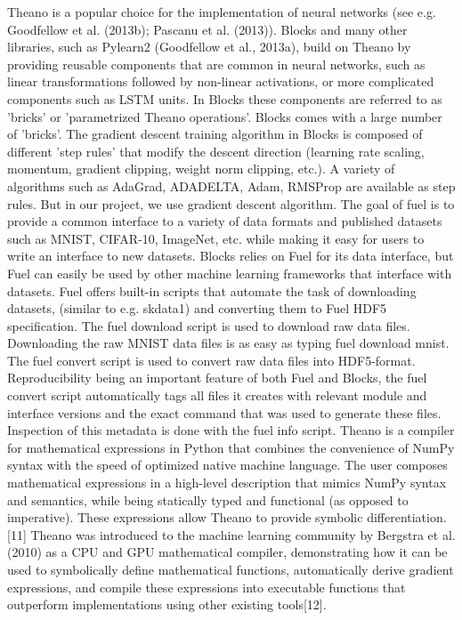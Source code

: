 \documentclass[runningheads,a4paper]{llncs}
\begin{document}
Theano is a popular choice for the implementation of neural networks (see e.g. Goodfellow et al. (2013b); Pascanu et al. (2013)). Blocks and many other libraries, such as Pylearn2 (Goodfellow et al., 2013a), build on Theano by providing reusable components that are common in neural networks, such as linear transformations followed by non-linear activations, or more complicated components such as LSTM units. In Blocks these components are referred to as 'bricks' or 'parametrized Theano operations'. 
Blocks comes with a large number of 'bricks'. 
The gradient descent training algorithm in Blocks is composed of different 'step rules' that modify the descent direction (learning rate scaling, momentum, gradient clipping, weight norm clipping, etc.). A variety of algorithms such as AdaGrad, ADADELTA, Adam, RMSProp are available as step rules. But in our project, we use gradient descent algorithm.
The goal of fuel is to provide a common interface to a variety of data formats and published datasets such as MNIST, CIFAR-10, ImageNet, etc. while making it easy for users to write an interface to new datasets. 
Blocks relies on Fuel for its data interface, but Fuel can easily be used by other machine learning frameworks that interface with datasets. 
Fuel offers built-in scripts that automate the task of downloading datasets, (similar to e.g. skdata1) and converting them to Fuel HDF5 specification. 
The fuel download script is used to download raw data files. Downloading the raw MNIST data files is as easy as typing fuel download mnist. The fuel convert script is used to convert raw data files into HDF5-format. 
Reproducibility being an important feature of both Fuel and Blocks, the fuel convert script automatically tags all files it creates with relevant module and interface versions and the exact command that was used to generate these files. Inspection of this metadata is done with the fuel info script. 
Theano is a compiler for mathematical expressions in Python that combines the convenience of NumPy syntax with the speed of optimized native machine language. The user composes mathematical expressions in a high-level description that mimics NumPy syntax and semantics, while being statically typed and functional (as opposed to imperative). These expressions allow Theano to provide symbolic differentiation. [11]
Theano was introduced to the machine learning community by Bergstra et al. (2010) as a CPU and GPU mathematical compiler, demonstrating how it can be used to symbolically define mathematical functions, automatically derive gradient expressions, and compile these expressions into executable functions that outperform implementations using other existing tools[12].
\end{document}
